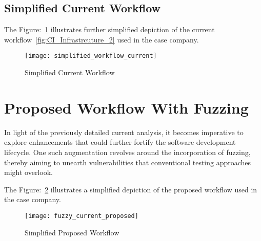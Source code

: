 \subsection{Simplified Current Workflow}

The Figure:~\ref{fig:simplified_workflow_current} illustrates further simplified depiction of the
current workflow~\ref{fig:CI_Infrastrcuture_2} used in the case company.


\begin{figure}[H]
\centering
\texttt{[image: simplified\_workflow\_current]}
\caption{Simplified Current Workflow}
\label{fig:simplified_workflow_current}
\end{figure}

\section{Proposed Workflow With Fuzzing}
In light of the previously detailed current analysis, it becomes imperative to
explore enhancements that could further fortify the software development
lifecycle. One such augmentation revolves around the incorporation of
fuzzing, thereby aiming to unearth vulnerabilities
that conventional testing approaches might overlook.

The Figure:~\ref{fig:simplified_workflow_proposed} illustrates a simplified depiction of the
proposed workflow used in the case company.
\begin{figure}[H]
\centering
\texttt{[image: fuzzy\_current\_proposed]}
\caption{Simplified Proposed Workflow}
\label{fig:simplified_workflow_proposed}
\end{figure}

